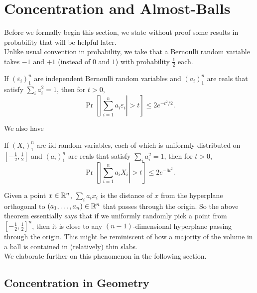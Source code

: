 
\section{Concentration and Almost-Balls}

Before we formally begin this section, we state without proof some results in probability that will be helpful later.\\

Unlike usual convention in probability, we take that a Bernoulli random variable takes $-1$ and $+1$ (instead of $0$ and $1$) with probability $\frac{1}{2}$ each.

\begin{ftheo}
\label{hoeffding's inequality}
If $(\varepsilon_i)_1^n$ are independent Bernoulli random variables and $(a_i)_1^n$ are reals that satisfy $\sum_i a_i^2 = 1$, then for $t>0$,
\[ \Pr\left[\left|\sum_{i=1}^n a_i\varepsilon_i\right| > t\right] \leq 2e^{-t^2/2}. \]
\end{ftheo}

We also have

\begin{theorem}
If $(X_i)_1^n$ are iid random variables, each of which is uniformly distributed on $[-\frac{1}{2},\frac{1}{2}]$ and $(a_i)_1^n$ are reals that satisfy $\sum_i a_i^2 = 1$, then for $t>0$,
\[ \Pr\left[\left|\sum_{i=1}^n a_i X_i\right| > t\right] \leq 2e^{-6t^2}. \]
\end{theorem}

Given a point $x\in\mathbb{R}^n$, $\sum_i a_i x_i$ is the distance of $x$ from the hyperplane orthogonal to $(a_1,\ldots,a_n)\in\mathbb{R}^n$ that passes through the origin. So the above theorem essentially says that if we uniformly randomly pick a point from $\left[-\frac{1}{2},\frac{1}{2}\right]^n$, then it is close to any $(n-1)$-dimensional hyperplane passing through the origin. This might be reminiscent of how a majority of the volume in a ball is contained in (relatively) thin slabs.\\
We elaborate further on this phenomenon in the following section.

\subsection{Concentration in Geometry}

